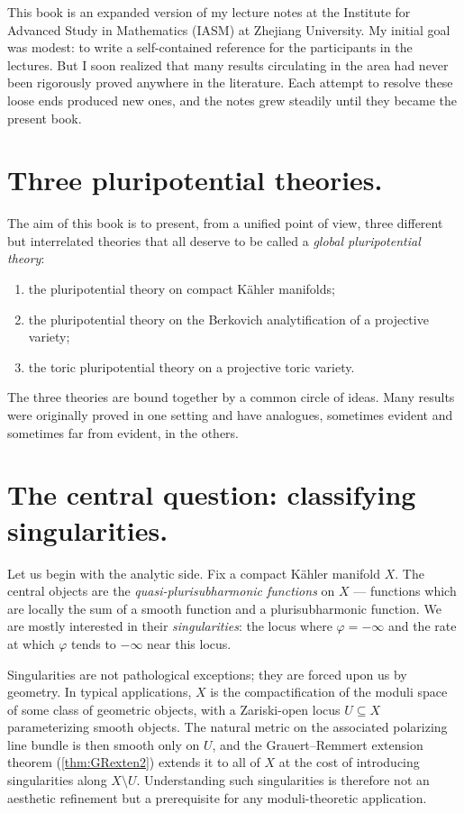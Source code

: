 \preface

This book is an expanded version of my lecture notes at the Institute for Advanced Study in Mathematics (IASM) at Zhejiang University. My initial goal was modest: to write a self-contained reference for the participants in the lectures. But I soon realized that many results circulating in the area had never been rigorously proved anywhere in the literature. Each attempt to resolve these loose ends produced new ones, and the notes grew steadily until they became the present book.

\section*{Three pluripotential theories.}
The aim of this book is to present, from a unified point of view, three different but interrelated theories that all deserve to be called a \emph{global pluripotential theory}:
\begin{enumerate}
    \item\label{itm:preface:L7:1} the pluripotential theory on compact Kähler manifolds;
    \item\label{itm:preface:L7:2} the pluripotential theory on the Berkovich analytification of a projective variety;
    \item\label{itm:preface:L7:3} the toric pluripotential theory on a projective toric variety.
\end{enumerate}
The three theories are bound together by a common circle of ideas. Many results were originally proved in one setting and have analogues, sometimes evident and sometimes far from evident, in the others.

\section*{The central question: classifying singularities.}
Let us begin with the analytic side. Fix a compact Kähler manifold $X$. The central objects are the \emph{quasi-plurisubharmonic functions} on $X$ --- functions which are locally the sum of a smooth function and a plurisubharmonic function. We are mostly interested in their \emph{singularities}: the locus where $\varphi=-\infty$ and the rate at which $\varphi$ tends to $-\infty$ near this locus.

Singularities are not pathological exceptions; they are forced upon us by geometry. In typical applications, $X$ is the compactification of the moduli space of some class of geometric objects, with a Zariski-open locus $U\subseteq X$ parameterizing smooth objects. The natural metric on the associated polarizing line bundle is then smooth only on $U$, and the Grauert--Remmert extension theorem (\cref{thm:GRexten2}) extends it to all of $X$ at the cost of introducing singularities along $X\setminus U$. Understanding such singularities is therefore not an aesthetic refinement but a prerequisite for any moduli-theoretic application.

